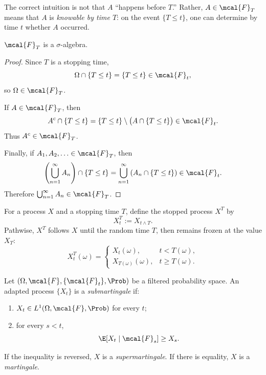The correct intuition is not that $A$ ``happens before $T$.'' Rather,
$A\in\mcal{F}_T$ means that $A$ is \emph{knowable by time $T$}: on the
event $\{T\leq t\}$, one can determine by time $t$ whether $A$
occurred.

\begin{proposition}
$\mcal{F}_T$ is a $\sigma$-algebra.
\end{proposition}

\begin{proof}
Since $T$ is a stopping time,
\[
    \Omega\cap\{T\leq t\}=\{T\leq t\}\in\mcal{F}_t,
\]
so $\Omega\in\mcal{F}_T$.

If $A\in\mcal{F}_T$, then
\[
    A^c\cap\{T\leq t\}
    =
    \{T\leq t\}\setminus\bigl(A\cap\{T\leq t\}\bigr)
    \in\mcal{F}_t.
\]
Thus $A^c\in\mcal{F}_T$.

Finally, if $A_1,A_2,\ldots\in\mcal{F}_T$, then
\[
    \left(\bigcup_{n=1}^\infty A_n\right)\cap\{T\leq t\}
    =
    \bigcup_{n=1}^\infty
    \left(A_n\cap\{T\leq t\}\right)
    \in\mcal{F}_t.
\]
Therefore $\bigcup_{n=1}^\infty A_n\in\mcal{F}_T$.
\end{proof}

For a process $X$ and a stopping time $T$, define the stopped process
$X^T$ by
\[
    X_t^T:=X_{t\wedge T}.
\]
Pathwise, $X^T$ follows $X$ until the random time $T$, then remains
frozen at the value $X_T$:
\[
    X_t^T(\omega)=
    \begin{cases}
        X_t(\omega), & t<T(\omega),\\
        X_{T(\omega)}(\omega), & t\geq T(\omega).
    \end{cases}
\]

\begin{definition}
Let $(\Omega,\mcal{F},\{\mcal{F}_t\},\Prob)$ be a filtered probability
space. An adapted process $\{X_t\}$ is a \emph{submartingale} if:

\begin{enumerate}
    \item[(i)] $X_t\in L^1(\Omega,\mcal{F},\Prob)$ for every $t$;
    \item[(ii)] for every $s<t$,
    \[
        \E[X_t\mid\mcal{F}_s]\geq X_s.
    \]
\end{enumerate}

If the inequality is reversed, $X$ is a \emph{supermartingale}. If
there is equality, $X$ is a \emph{martingale}.
\end{definition}

